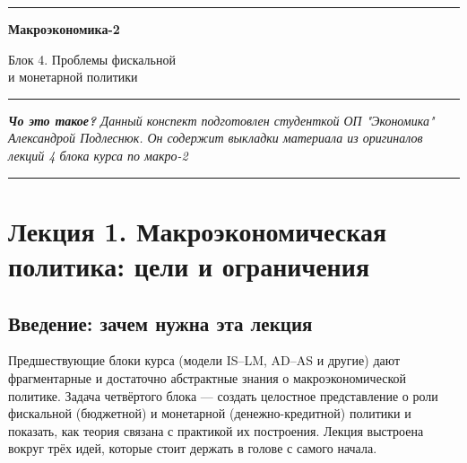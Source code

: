 \documentclass[11pt,a4paper]{article}
\begin{document}
\begin{titlepage}
    \thispagestyle{empty}
    \centering

    \textcolor{mainblue}{\rule{\textwidth}{1.2pt}}

    \vspace{1.2cm}

    {\color{mainblue}\Huge\bfseries Макроэкономика-2\par}

    \vspace{0.6cm}

    {\color{mainblue}\Large Блок 4. Проблемы фискальной\\ и монетарной политики\par}

    \vspace{0.6cm}

    \vspace{0.6cm}

    \textcolor{mainblue}{\rule{\textwidth}{0.4pt}}

    \vfill

    \begin{minipage}{0.85\textwidth}
        \small\itshape
        \textbf{Чо это такое?} Данный конспект подготовлен студенткой ОП "Экономика" Александрой Подлеснюк. Он содержит выкладки материала из оригиналов лекций 4 блока курса по макро-2
    \end{minipage}

    \vspace{1cm}

    \textcolor{mainblue}{\rule{\textwidth}{1.2pt}}
\end{titlepage}

\newpage
\tableofcontents
\newpage

\section{Лекция 1. Макроэкономическая политика: цели и ограничения}

\subsection{Введение: зачем нужна эта лекция}

Предшествующие блоки курса (модели IS--LM, AD--AS и другие) дают фрагментарные и достаточно абстрактные знания о макроэкономической политике. Задача четвёртого блока --- создать целостное представление о роли фискальной (бюджетной) и монетарной (денежно-кредитной) политики и показать, как теория связана с практикой их построения. Лекция выстроена вокруг трёх идей, которые стоит держать в голове с самого начала.
\end{document}
